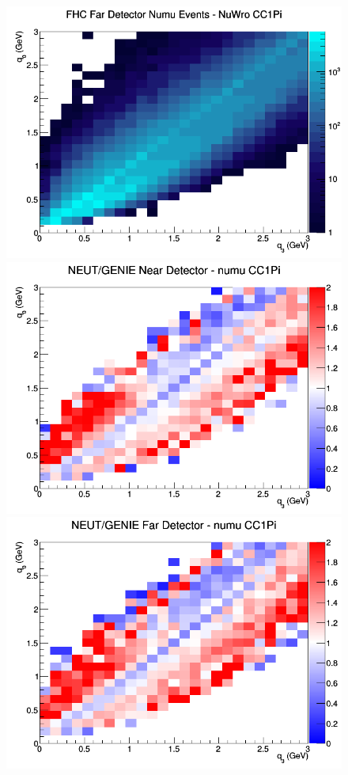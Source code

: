 \begin{figure}[h]
\endminipage
{}
\includegraphics[width=\linewidth]{eff_q0_q3/LAr/CC1Pi_FHC_FD_numu_q3_q0_NuWro.png}
\endminipage
\newline
{}
\includegraphics[width=\linewidth]{eff_q0_q3/LAr/ratios/CC1Pi_NEUT_GENIE_numu_near_q3_q0.png}
\endminipage
{}
\includegraphics[width=\linewidth]{eff_q0_q3/LAr/ratios/CC1Pi_NEUT_GENIE_numu_far_q3_q0.png}

\end{figure}
